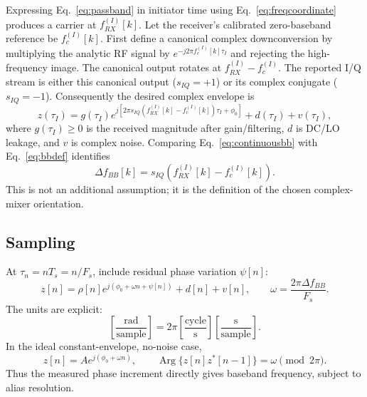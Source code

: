 \documentclass[10pt,a4paper]{article}
\newcommand{\argp}{\operatorname{Arg}}
\begin{document}
Expressing Eq.~\ref{eq:passband} in initiator time using Eq.~\ref{eq:freqcoordinate} produces a carrier at $f_{RX}^{(I)}[k]$. Let the receiver's calibrated zero-baseband reference be $f_c^{(I)}[k]$. First define a canonical complex downconversion by multiplying the analytic RF signal by $e^{-j2\pi f_c^{(I)}[k]\tau_I}$ and rejecting the high-frequency image. The canonical output rotates at $f_{RX}^{(I)}-f_c^{(I)}$. The reported I/Q stream is either this canonical output ($s_{IQ}=+1$) or its complex conjugate ($s_{IQ}=-1$). Consequently the desired complex envelope is
\begin{equation}
z(\tau_I)=g(\tau_I)
e^{j[2\pi s_{IQ}(f_{RX}^{(I)}[k]-f_c^{(I)}[k])\tau_I+\phi_0]}
+d(\tau_I)+v(\tau_I),
\label{eq:continuousbb}
\end{equation}
where $g(\tau_I)\ge0$ is the received magnitude after gain/filtering, $d$ is DC/LO leakage, and $v$ is complex noise. Comparing Eq.~\ref{eq:continuousbb} with Eq.~\ref{eq:bbdef} identifies
\begin{equation}
\Delta f_{BB}[k]=s_{IQ}(f_{RX}^{(I)}[k]-f_c^{(I)}[k]).
\end{equation}
This is not an additional assumption; it is the definition of the chosen complex-mixer orientation.

\subsection{Sampling}
At $\tau_n=nT_s=n/F_s$, include residual phase variation $\psi[n]$:
\begin{equation}
z[n]=\rho[n]e^{j(\phi_0+\omega n+\psi[n])}+d[n]+v[n],
\qquad
\omega=\frac{2\pi\Delta f_{BB}}{F_s}.
\label{eq:samplemodel}
\end{equation}
The units are explicit:
\begin{equation}
\left[\frac{\mathrm{rad}}{\mathrm{sample}}\right]
=2\pi\left[\frac{\mathrm{cycle}}{\mathrm{s}}\right]
\left[\frac{\mathrm{s}}{\mathrm{sample}}\right].
\end{equation}
In the ideal constant-envelope, no-noise case,
\begin{equation}
z[n]=Ae^{j(\phi_0+\omega n)},\qquad
\argp\{z[n]z^*[n-1]\}=\omega\pmod{2\pi}.
\label{eq:increment}
\end{equation}
Thus the measured phase increment directly gives baseband frequency, subject to alias resolution.
\end{document}
